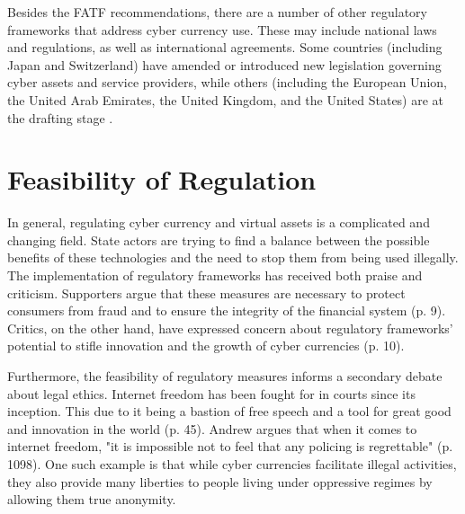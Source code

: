 Besides the FATF recommendations, there are a number of other regulatory frameworks that address cyber currency use. These may include national laws and regulations, as well as international agreements. Some countries (including Japan and Switzerland) have amended or introduced new legislation governing cyber assets and service providers, while others (including the European Union, the United Arab Emirates, the United Kingdom, and the United States) are at the drafting stage \cite{narain_aditya_regulating_2022}. 

\section{Feasibility of Regulation}
In general, regulating cyber currency and virtual assets is a complicated and changing field. State actors are trying to find a balance between the possible benefits of these technologies and the need to stop them from being used illegally. The implementation of regulatory frameworks has received both praise and criticism. Supporters argue that these measures are necessary to protect consumers from fraud and to ensure the integrity of the financial system \cite{financial_action_task_force_fatf_2012} (p. 9). Critics, on the other hand, have expressed concern about regulatory frameworks' potential to stifle innovation and the growth of cyber currencies \cite{demertzis_economic_2018} (p. 10).

Furthermore, the feasibility of regulatory measures informs a secondary debate about legal ethics. Internet freedom has been fought for in courts since its inception. This due to it being a bastion of free speech and a tool for great good and innovation in the world  \cite{lacson_21st_2016} (p. 45). Andrew argues that when it comes to internet freedom, "it is impossible not to feel that any policing is regrettable"  \cite{andrew_internet_2010} (p. 1098). One such example is that while cyber currencies facilitate illegal activities, they also provide many liberties to people living under oppressive regimes by allowing them true anonymity.



